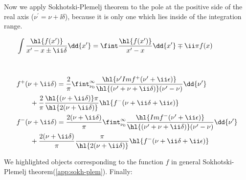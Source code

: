 Now we apply Sokhotski-Plemelj theorem to the pole at the positive side of the real axis ($\nu^\prime = \nu+\ii \delta$), because it is only one which lies inside of the integration range.

\begin{align}
    &\int \frac{\hl{f(x^\prime)}}{x^\prime - x \pm \ii \delta} \dd{x^\prime} = \fint \frac{\hl{f(x^\prime)}}{x^\prime - x} \dd{x^\prime} \mp \ii \pi f(x) \label{app:sokh-plem} \\[1cm]
    &f^{+}(\nu+\ii \delta) = \frac{2}{\pi} \fint_{\nu_0}^{\infty} \frac{\hl{\nu^\prime Im f^{+}(\nu^\prime+\ii \epsilon)}}{\hl{(\nu^\prime + \nu + \ii \delta)}(\nu^\prime - \nu)} \dd{\nu^\prime} \nonumber \\
    &\qquad+ \frac{2}{\pi} \frac{\hl{(\nu + \ii \delta)} \pi}{\hl{2 (\nu + \ii \delta)}} \hl{f^{-}(\nu + \ii \delta + \ii \epsilon)} \\
    &f^{-}(\nu+\ii \delta) = \frac{2 (\nu+\ii \delta)}{\pi} \fint_{\nu_0}^{\infty} \frac{\hl{Im f^{-}(\nu^\prime+\ii \epsilon)}}{\hl{(\nu^\prime + \nu + \ii \delta)}(\nu^\prime - \nu)} \dd{\nu^\prime} \nonumber \\
    &\qquad+ \frac{2 (\nu+\ii \delta)}{\pi} \frac{\pi}{\hl{2 (\nu + \ii \delta)}} \hl{f^{-}(\nu + \ii \delta + \ii \epsilon)}
\end{align}

We highlighted objects corresponding to the function $f$ in general Sokhotski-Plemelj theorem(\cref{app:sokh-plem}). Finally: \\[1cm]

